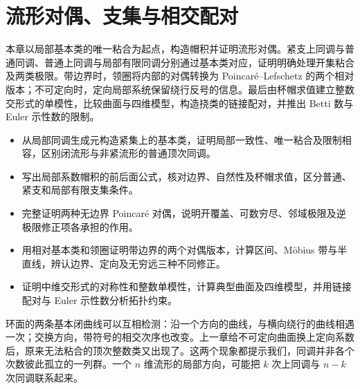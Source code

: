 
% 
% 

\chapter{流形对偶、支集与相交配对}
\label{g2:ch:06}

\begin{chapterabstract}
	本章以局部基本类的唯一粘合为起点，构造帽积并证明流形对偶。紧支上同调与普通同调、普通上同调与局部有限同调分别通过基本类对应，证明明确处理开集粘合及两类极限。带边界时，领圈将内部的对偶转换为 Poincaré--Lefschetz 的两个相对版本；不可定向时，定向局部系统保留绕行反号的信息。最后由杯帽求值建立整数交形式的单模性，比较曲面与四维模型，构造挠类的链接配对，并推出 Betti 数与 Euler 示性数的限制。
\end{chapterabstract}

\begin{learninggoals}
	\begin{itemize}
		\item 从局部同调生成元构造紧集上的基本类，证明局部一致性、唯一粘合及限制相容，区别闭流形与非紧流形的普通顶次同调。
		\item 写出局部系数帽积的前后面公式，核对边界、自然性及杯帽求值，区分普通、紧支和局部有限支集条件。
		\item 完整证明两种无边界 Poincaré 对偶，说明开覆盖、可数穷尽、邻域极限及逆极限修正项各承担的作用。
		\item 用相对基本类和领圈证明带边界的两个对偶版本，计算区间、Möbius 带与半直线，辨认边界、定向及无穷远三种不同修正。
		\item 证明中维交形式的对称性和整数单模性，计算典型曲面及四维模型，并用链接配对与 Euler 示性数分析拓扑约束。
	\end{itemize}
\end{learninggoals}

环面的两条基本闭曲线可以互相检测：沿一个方向的曲线，与横向绕行的曲线相遇一次；交换方向，带符号的相交次序也改变。上一章给不可定向曲面换上定向系数后，原来无法粘合的顶次整数类又出现了。这两个现象都提示我们，同调并非各个次数彼此孤立的一列群。一个 \(n\) 维流形的局部方向，可能把 \(k\) 次上同调与 \(n-k\) 次同调联系起来。

